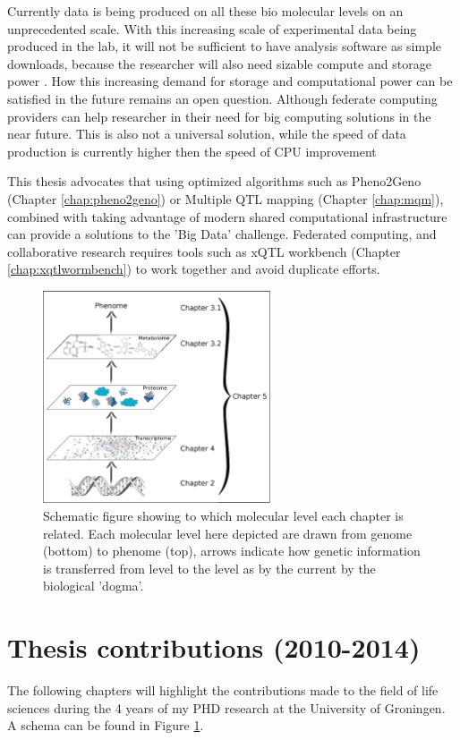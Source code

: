 Currently data is being produced on all these bio molecular levels on an unprecedented scale.
With this increasing scale of experimental data being produced in the lab, it will not be 
sufficient to have analysis software as simple downloads, because the researcher will 
also need sizable compute and storage power \cite{Schadt:2010}. How this increasing demand 
for storage and computational power can be satisfied in the future remains an open 
question. Although federate computing providers can help researcher in their need for big 
computing solutions in the near future. This is also not a universal solution, while the speed 
of data production is currently higher then the speed of CPU improvement \cite{Moore:1998, Editorial:2009, Shah:2013}

This thesis advocates that using optimized algorithms such as Pheno2Geno (Chapter \ref{chap:pheno2geno}) or Multiple QTL 
mapping (Chapter \ref{chap:mqm}), combined with taking advantage of modern shared computational infrastructure can provide 
a solutions to the 'Big Data' challenge. Federated computing, and collaborative research requires tools 
such as xQTL workbench (Chapter \ref{chap:xqtlwormbench}) to work together and avoid duplicate efforts.

\begin{figure}[h!]
 \centering
    \includegraphics[width=0.6\textwidth]{eps/image_1_3}
  \caption[ThesisLayout.]
    {Schematic figure showing to which molecular level each chapter is related. Each molecular 
    level here depicted are drawn from genome (bottom) to phenome (top), arrows indicate 
    how genetic information is transferred from level to the level as by the current by 
    the biological 'dogma'.}
    \label{fig:layout}
\end{figure}

\section{Thesis contributions (2010-2014)}
The following chapters will highlight the contributions made to the field of life 
sciences during the 4 years of my PHD research at the University of Groningen. A schema 
can be found in Figure \ref{fig:layout}.

